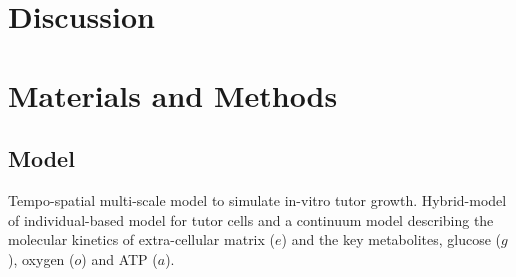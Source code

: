\documentclass[10pt,letterpaper]{article}
\begin{document}


\section*{Discussion}


\section*{Materials and Methods}
\subsection*{Model}
Tempo-spatial multi-scale model to simulate in-vitro tutor growth. Hybrid-model of individual-based model for tutor cells and a continuum model describing the molecular kinetics of extra-cellular matrix ($e$) and the key metabolites, glucose ($g$), oxygen ($o$) and ATP ($a$). 
\end{document}
